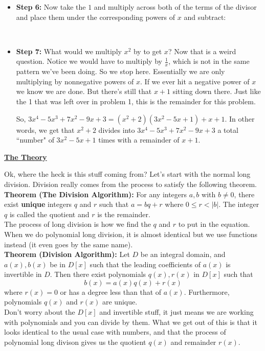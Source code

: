 \documentclass[letterpaper,11pt]{amsart}
\theoremstyle{plain}
\theoremstyle{definition}
\theoremstyle{remark}
\newcommand{\<}{\langle}
\renewcommand{\>}{\rangle}
\begin{document}
\begin{itemize}
\\


\item \textbf{Step 6:} Now take the $1$ and multiply across both of the terms of the divisor and place them under the corresponding powers of $x$ and subtract:

\\

\item \textbf{Step 7:} What would we multiply $x^2$ by to get $x$?  Now that is a weird question.  Notice we would have to multiply by $\frac{1}{x}$, which is not in the same pattern we've been doing.  So we stop here.  Essentially we are only multiplying by nonnegative powers of $x$.  If we ever hit a negative power of $x$ we know we are done.  But there's still that $x+1$ sitting down there.  Just like the 1 that was left over in problem 1, this is the remainder for this problem.   

So, $3x^4-5x^3+7x^2-9x+3 = (x^2+2)(3x^2-5x+1) + x+1$.  In other words, we get that $x^2+2$ divides into $3x^4-5x^3+7x^2-9x+3$ a total ``number"  of $3x^2-5x+1$ times with a remainder of $x+1$.

\end{itemize}
\bigskip

\textbf{\underline{\Large{The Theory}}}

Ok, where the heck is this stuff coming from?  Let's start with the normal long division.   Division really comes from the process to satisfy the following theorem.\\

\textbf{Theorem (The Division Algorithm):}  For any integers $a,b$ with $b \neq 0$, there exist \textbf{unique} integers $q$ and $r$ such that $a=bq+r$ where $0 \leq r < |b|$.  The integer $q$ is called the quotient and $r$ is the remainder.\\

The process of long division is how we find the $q$ and $r$ to put in the equation.  When we do polynomial long division, it is almost identical but we use functions instead (it even goes by the same name).\\

\textbf{Theorem (Division Algorithm):}  Let $D$ be an integral domain, and $a(x), b(x)$ be in $D[x]$ such that the leading coefficients of $a(x)$ is invertible in $D$.  Then there exist polynomials $q(x), r(x)$ in $D[x]$ such that $$b(x) = a(x) q(x) + r(x) $$ where $r(x) =0$ or has a degree less than that of $a(x)$.  Furthermore, polynomials $q(x)$ and $r(x)$ are unique.\\

Don't worry about the $D[x]$ and invertible stuff, it just means we are working with polynomials and you can divide by them.   What we get out of this is that it looks identical to the usual case with numbers, and that the process of polynomial long divison gives us the quotient $q(x)$ and remainder $r(x)$.
\end{document}
